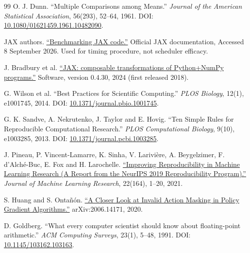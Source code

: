 \documentclass[12pt,a4paper]{article}
\begin{document}
\begin{thebibliography}{99}
 O. J. Dunn. ``Multiple Comparisons among Means.'' \emph{Journal of the American Statistical Association}, 56(293), 52--64, 1961. DOI: \href{\detokenize{https://doi.org/10.1080/01621459.1961.10482090}}{10.1080/01621459.1961.10482090}.

 JAX authors. \href{\detokenize{https://docs.jax.dev/en/latest/benchmarking.html}}{``Benchmarking JAX code.''} Official JAX documentation, Accessed 8 September 2026. Used for timing procedure, not scheduler efficacy.

 J. Bradbury et al. \href{\detokenize{https://github.com/jax-ml/jax}}{``JAX: composable transformations of Python+NumPy programs.''} Software, version 0.4.30, 2024 (first released 2018).

 G. Wilson et al. ``Best Practices for Scientific Computing.'' \emph{PLOS Biology}, 12(1), e1001745, 2014. DOI: \href{\detokenize{https://journals.plos.org/plosbiology/article?id=10.1371/journal.pbio.1001745}}{10.1371/journal.pbio.1001745}.

 G. K. Sandve, A. Nekrutenko, J. Taylor and E. Hovig. ``Ten Simple Rules for Reproducible Computational Research.'' \emph{PLOS Computational Biology}, 9(10), e1003285, 2013. DOI: \href{\detokenize{https://journals.plos.org/ploscompbiol/article?id=10.1371/journal.pcbi.1003285}}{10.1371/journal.pcbi.1003285}.

 J. Pineau, P. Vincent-Lamarre, K. Sinha, V. Larivière, A. Beygelzimer, F. d'Alché-Buc, E. Fox and H. Larochelle. \href{\detokenize{https://jmlr.org/papers/v22/20-303.html}}{``Improving Reproducibility in Machine Learning Research (A Report from the NeurIPS 2019 Reproducibility Program).''} \emph{Journal of Machine Learning Research}, 22(164), 1--20, 2021.

 S. Huang and S. Ontañón. \href{\detokenize{https://arxiv.org/abs/2006.14171}}{``A Closer Look at Invalid Action Masking in Policy Gradient Algorithms.''} arXiv:2006.14171, 2020.

 D. Goldberg. ``What every computer scientist should know about floating-point arithmetic.'' \emph{ACM Computing Surveys}, 23(1), 5--48, 1991. DOI: \href{\detokenize{https://doi.org/10.1145/103162.103163}}{10.1145/103162.103163}.


\end{thebibliography}
\end{document}
